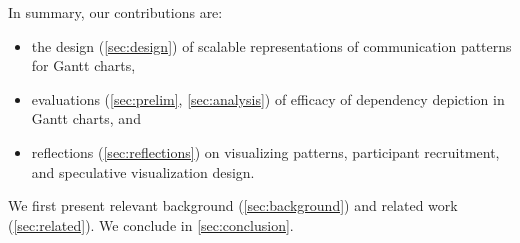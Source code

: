 In summary, our contributions are:

\vspace{-0.5ex}

\begin{itemize}
    \itemsep0em
    \item the design (\autoref{sec:design}) of scalable representations of communication patterns for Gantt charts, 
    
    \item evaluations (\autoref{sec:prelim}, \autoref{sec:analysis}) of efficacy of dependency depiction in Gantt charts, and
    
    \item reflections (\autoref{sec:reflections}) on visualizing patterns, participant recruitment, and speculative visualization design. 
    
\end{itemize}

We first present relevant background (\autoref{sec:background}) and related work (\autoref{sec:related}). We conclude in \autoref{sec:conclusion}.

